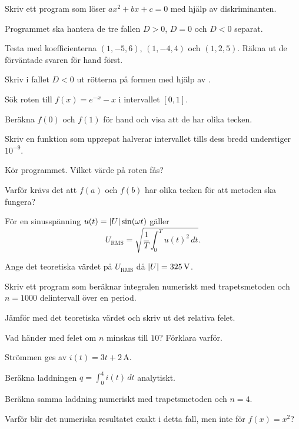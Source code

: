 \begin{parts}
  \item Skriv ett program som löser $ax^2 + bx + c = 0$ med hjälp av diskriminanten.
  \item Programmet ska hantera de tre fallen $D > 0$, $D = 0$ och $D < 0$ separat.
  \item Testa med koefficienterna $(1, -5, 6)$, $(1, -4, 4)$ och $(1, 2, 5)$. Räkna ut de
    förväntade svaren för hand först.
  \item Skriv i fallet $D < 0$ ut rötterna på formen  med hjälp av .
\end{parts}

Sök roten till $f(x) = e^{-x} - x$ i intervallet $[0, 1]$.
\begin{parts}
  \item Beräkna $f(0)$ och $f(1)$ för hand och visa att de har olika tecken.
  \item Skriv en funktion  som upprepat halverar intervallet tills dess bredd
    understiger $10^{-9}$.
  \item Kör programmet. Vilket värde på roten fås?
  \item Varför krävs det att $f(a)$ och $f(b)$ har olika tecken för att metoden ska fungera?
\end{parts}

För en sinusspänning $u(t) = \lvert U\rvert\sin(\omega t)$ gäller
\[
  U_{\text{RMS}} = \sqrt{\frac{1}{T}\int_0^T u(t)^2\,dt}.
\]
\begin{parts}
  \item Ange det teoretiska värdet på $U_{\text{RMS}}$ då $\lvert U\rvert = 325\,\text{V}$.
  \item Skriv ett program som beräknar integralen numeriskt med trapetsmetoden och $n = 1000$
    delintervall över en period.
  \item Jämför med det teoretiska värdet och skriv ut det relativa felet.
  \item Vad händer med felet om $n$ minskas till $10$? Förklara varför.
\end{parts}

Strömmen ges av $i(t) = 3t + 2\,\text{A}$.
\begin{parts}
  \item Beräkna laddningen $q = \int_0^4 i(t)\,dt$ analytiskt.
  \item Beräkna samma laddning numeriskt med trapetsmetoden och $n = 4$.
  \item Varför blir det numeriska resultatet exakt i detta fall, men inte för $f(x) = x^2$?
\end{parts}

